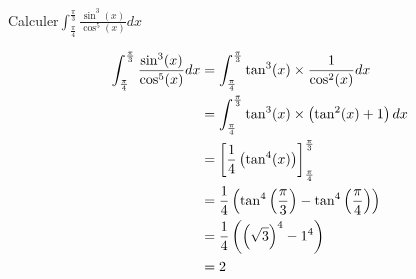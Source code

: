 \begin{exoex}
	Calculer\(\int_{\frac{\pi}{4}}^{\frac{\pi}{3}} \frac{\sin^3(x)}{\cos^5(x)} dx\)
\end{exoex}

\begin{corr}
	\begin{align*}
		\int_{\frac{\pi}{4}}^{\frac{\pi}{3}} \frac{\sin^3(x)}{\cos^5(x)} dx & = \int_{\frac{\pi}{4}}^{\frac{\pi}{3}} \tan^3(x) \times \frac{1}{\cos^2(x)} dx \\
		                                                                    & = \int_{\frac{\pi}{4}}^{\frac{\pi}{3}} \tan^3(x) \times \left(\tan^2(x)+1\right) dx \\
		                                                                    & = \left[\frac{1}{4}\left(\tan^4(x) \right)\right]_{\frac{\pi}{4}}^{\frac{\pi}{3}}        \\
		                                                                    & = \frac{1}{4}\left(\tan^4\left(\frac{\pi}{3}\right) - \tan^4\left(\frac{\pi}{4}\right)\right) \\
		                                                                    & = \frac{1}{4}\left(\left(\sqrt{3}\right)^4 - 1^4\right)                                  \\
		                                                                    & = 2                                                                            \\
	\end{align*}
\end{corr}

